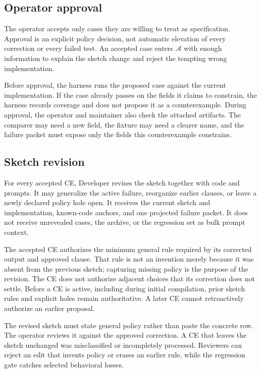 \documentclass[11pt]{article}
\newcommand{\archive}{\mathcal{A}}
\begin{document}
\subsection{Operator approval}

The operator accepts only cases they are willing to treat as specification.  Approval is an
explicit policy decision, not automatic elevation of every correction or every failed test.  An
accepted case enters $\archive$ with enough information to explain the sketch change and reject
the tempting wrong implementation.

Before approval, the harness runs the proposed case against the current implementation.  If the
case already passes on the fields it claims to constrain, the harness records coverage and does
not propose it as a counterexample.  During approval, the operator and maintainer also check the
attached artifacts.  The comparer may need a new field, the fixture may need a clearer name, and
the failure packet must expose only the fields this counterexample constrains.

\subsection{Sketch revision}

For every accepted CE, Developer revises the sketch together with code and prompts.  It may
generalize the active failure, reorganize earlier clauses, or leave a newly declared policy hole
open.  It receives the current sketch and implementation, known-code anchors, and one projected
failure packet.  It does not receive unrevealed cases, the archive, or the regression set as bulk
prompt context.

The accepted CE authorizes the minimum general rule required by its corrected output and approved
clause.  That rule is not an invention merely because it was absent from the previous sketch;
capturing missing policy is the purpose of the revision.  The CE does not authorize adjacent
choices that its correction does not settle.  Before a CE is active, including during initial
compilation, prior sketch rules and explicit holes remain authoritative.  A later CE cannot
retroactively authorize an earlier proposal.

The revised sketch must state general policy rather than paste the concrete row.  The operator
reviews it against the approved correction.  A CE that leaves the sketch unchanged was
misclassified or incompletely processed.  Reviewers can reject an edit that invents policy or
erases an earlier rule, while the regression gate catches selected behavioral losses.
\end{document}
